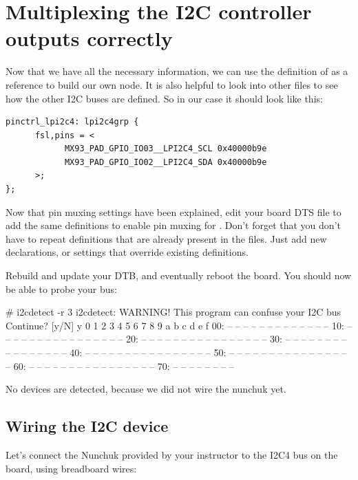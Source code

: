 \section{Multiplexing the I2C controller outputs correctly}

Now that we have all the necessary information, we can use the definition of  as a reference to build our own  node.
It is also helpful to look into other  files to see how the other I2C buses are defined. So in our case it should look like this:

{\small
\begin{verbatim}
pinctrl_lpi2c4: lpi2c4grp {
      fsl,pins = <
            MX93_PAD_GPIO_IO03__LPI2C4_SCL 0x40000b9e
            MX93_PAD_GPIO_IO02__LPI2C4_SDA 0x40000b9e
      >;
};
\end{verbatim}
}

Now that pin muxing settings have been explained, edit your board
DTS file to add the same definitions to enable pin muxing for .
Don't forget that you don't have to repeat definitions that are
already present in the  files. Just add new declarations, or
settings that override existing definitions.

Rebuild and update your DTB, and eventually reboot the board. You should
now be able to probe your bus:

\begin{bashinput}
# i2cdetect -r 3
i2cdetect: WARNING! This program can confuse your I2C bus
Continue? [y/N] y
     0  1  2  3  4  5  6  7  8  9  a  b  c  d  e  f
00:          -- -- -- -- -- -- -- -- -- -- -- -- --
10: -- -- -- -- -- -- -- -- -- -- -- -- -- -- -- --
20: -- -- -- -- -- -- -- -- -- -- -- -- -- -- -- --
30: -- -- -- -- -- -- -- -- -- -- -- -- -- -- -- --
40: -- -- -- -- -- -- -- -- -- -- -- -- -- -- -- --
50: -- -- -- -- -- -- -- -- -- -- -- -- -- -- -- --
60: -- -- -- -- -- -- -- -- -- -- -- -- -- -- -- --
70: -- -- -- -- -- -- -- --
\end{bashinput}

No devices are detected, because we did not wire the nunchuk yet.

\subsection{Wiring the I2C device}

Let's connect the Nunchuk provided by your instructor
to the I2C4 bus on the board, using breadboard wires:

